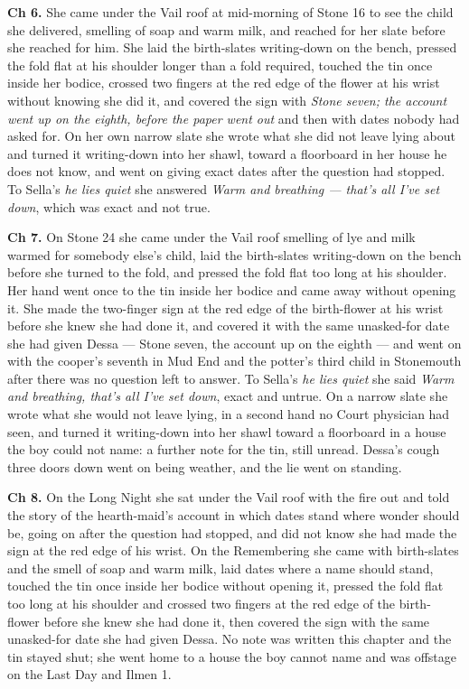 \documentclass{design/chronicle}
\begin{document}
{\textbf{Ch 6.} She came under the Vail roof at mid-morning of Stone 16 to see the child she delivered, smelling of soap and warm milk, and reached for her slate before she reached for him. She laid the birth-slates writing-down on the bench, pressed the fold flat at his shoulder longer than a fold required, touched the tin once inside her bodice, crossed two fingers at the red edge of the flower at his wrist without knowing she did it, and covered the sign with \emph{Stone seven; the account went up on the eighth, before the paper went out} and then with dates nobody had asked for. On her own narrow slate she wrote what she did not leave lying about and turned it writing-down into her shawl, toward a floorboard in her house he does not know, and went on giving exact dates after the question had stopped. To Sella’s \emph{he lies quiet} she answered \emph{Warm and breathing --- that’s all I’ve set down}, which was exact and not true.

\textbf{Ch 7.} On Stone 24 she came under the Vail roof smelling of lye and milk warmed for somebody else’s child, laid the birth-slates writing-down on the bench before she turned to the fold, and pressed the fold flat too long at his shoulder. Her hand went once to the tin inside her bodice and came away without opening it. She made the two-finger sign at the red edge of the birth-flower at his wrist before she knew she had done it, and covered it with the same unasked-for date she had given Dessa --- Stone seven, the account up on the eighth --- and went on with the cooper’s seventh in Mud End and the potter’s third child in Stonemouth after there was no question left to answer. To Sella’s \emph{he lies quiet} she said \emph{Warm and breathing, that’s all I’ve set down}, exact and untrue. On a narrow slate she wrote what she would not leave lying, in a second hand no Court physician had seen, and turned it writing-down into her shawl toward a floorboard in a house the boy could not name: a further note for the tin, still unread. Dessa’s cough three doors down went on being weather, and the lie went on standing.

\textbf{Ch 8.} On the Long Night she sat under the Vail roof with the fire out and told the story of the hearth-maid’s account in which dates stand where wonder should be, going on after the question had stopped, and did not know she had made the sign at the red edge of his wrist. On the Remembering she came with birth-slates and the smell of soap and warm milk, laid dates where a name should stand, touched the tin once inside her bodice without opening it, pressed the fold flat too long at his shoulder and crossed two fingers at the red edge of the birth-flower before she knew she had done it, then covered the sign with the same unasked-for date she had given Dessa. No note was written this chapter and the tin stayed shut; she went home to a house the boy cannot name and was offstage on the Last Day and Ilmen 1.

}
\end{document}
